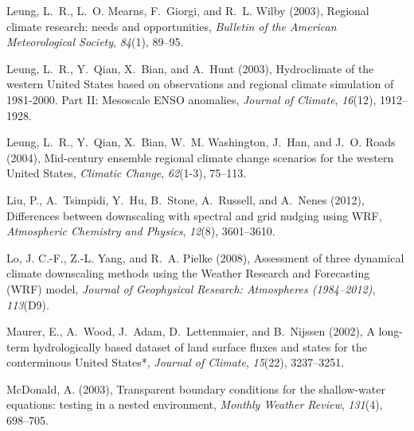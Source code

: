 \documentclass[ms]{agutex}   %
\begin{document}
\begin{article}
\begin{thebibliography}{84}
Leung, L.~R., L.~O. Mearns, F.~Giorgi, and R.~L. Wilby (2003{}),
  Regional climate research: needs and opportunities, \textit{Bulletin of the
  American Meteorological Society}, \textit{84}(1), 89--95.

Leung, L.~R., Y.~Qian, X.~Bian, and A.~Hunt (2003{}), {Hydroclimate
  of the western United States based on observations and regional climate
  simulation of 1981-2000. Part II: Mesoscale ENSO anomalies}, \textit{Journal
  of Climate}, \textit{16}(12), 1912--1928.

Leung, L.~R., Y.~Qian, X.~Bian, W.~M. Washington, J.~Han, and J.~O. Roads
  (2004), {Mid-century ensemble regional climate change scenarios for the
  western United States}, \textit{Climatic Change}, \textit{62}(1-3), 75--113.

Liu, P., A.~Tsimpidi, Y.~Hu, B.~Stone, A.~Russell, and A.~Nenes (2012),
  {Differences between downscaling with spectral and grid nudging using WRF},
  \textit{Atmospheric Chemistry and Physics}, \textit{12}(8), 3601--3610.

Lo, J. C.-F., Z.-L. Yang, and R.~A. Pielke (2008), {Assessment of three
  dynamical climate downscaling methods using the Weather Research and
  Forecasting (WRF) model}, \textit{Journal of Geophysical Research:
  Atmospheres (1984--2012)}, \textit{113}(D9).

Maurer, E., A.~Wood, J.~Adam, D.~Lettenmaier, and B.~Nijssen (2002), {A
  long-term hydrologically based dataset of land surface fluxes and states for
  the conterminous United States*}, \textit{Journal of Climate},
  \textit{15}(22), 3237--3251.

McDonald, A. (2003), Transparent boundary conditions for the shallow-water
  equations: testing in a nested environment, \textit{Monthly Weather Review},
  \textit{131}(4), 698--705.


\end{thebibliography}
\end{article}
\end{document}
